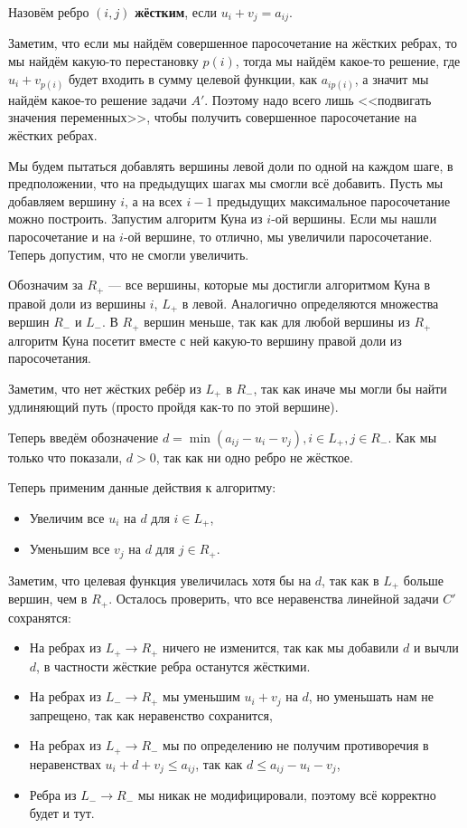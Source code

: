 \documentclass[a4paper, 12pt]{article}
\begin{document}
\begin{Def}
  Назовём ребро $(i, j)$ \textbf{жёстким}, если $u_i + v_j = a_{ij}$.
\end{Def}

Заметим, что если мы найдём совершенное паросочетание на жёстких ребрах, то
мы найдём какую-то перестановку $p(i)$, тогда мы найдём какое-то решение, где
$u_i + v_{p(i)}$ будет входить в сумму целевой функции, как $a_{ip(i)}$, а значит
мы найдём какое-то решение задачи $A'$. Поэтому надо всего лишь <<подвигать
значения переменных>>, чтобы получить совершенное паросочетание на жёстких ребрах.

Мы будем пытаться добавлять вершины левой доли по одной на каждом шаге, в предположении,
что на предыдущих шагах мы смогли всё добавить. Пусть мы добавляем вершину $i$,
а на всех $i-1$ предыдущих максимальное паросочетание можно построить. Запустим
алгоритм Куна из $i$-ой вершины. Если мы нашли паросочетание и на $i$-ой вершине,
то отлично, мы увеличили паросочетание. Теперь допустим, что не смогли увеличить.

Обозначим за $R_{+}$ --- все вершины, которые мы достигли алгоритмом
Куна в правой доли из вершины $i$,
$L_{+}$ в левой. Аналогично определяются множества вершин
$R_{-}$ и $L_{-}$. В $R_{+}$ вершин меньше, так как для любой вершины из
$R_+$ алгоритм Куна посетит вместе с ней какую-то вершину правой доли из
паросочетания. 

Заметим, что нет жёстких ребёр из $L_+$ в $R_-$, так как иначе мы могли бы
найти удлиняющий путь (просто пройдя как-то по этой вершине).

Теперь введём обозначение $d = \min(a_{ij} - u_i - v_j), i \in L_+, j \in R_-$.
Как мы только что показали, $d > 0$, так как ни одно ребро не жёсткое.

Теперь применим данные действия к алгоритму:

\begin{itemize}
  \item Увеличим все $u_i$ на $d$ для $i \in L_+$,
  \item Уменьшим все $v_j$ на $d$ для $j \in R_+$. 
\end{itemize}

Заметим, что целевая функция увеличилась хотя бы на $d$, так как в $L_+$ больше
вершин, чем в $R_+$. Осталось проверить, что все неравенства линейной задачи $C'$
сохранятся:

\begin{itemize}
  \item На ребрах из $L_+ \to R_+$ ничего не изменится, так как мы добавили
  $d$ и вычли $d$, в частности жёсткие ребра останутся жёсткими.
  \item На ребрах из $L_- \to R_+$ мы уменьшим $u_i + v_j$ на $d$, но уменьшать
  нам не запрещено, так как неравенство сохранится,
  \item На ребрах из $L_+ \to R_-$ мы по определению не получим противоречия
  в неравенствах $u_i + d + v_j \leqslant a_{ij}$, так как $d \leqslant a_{ij} - u_i - v_j$,
  \item Ребра из $L_- \to R_-$ мы никак не модифицировали, поэтому всё корректно
  будет и тут.
\end{itemize}
\end{document}

